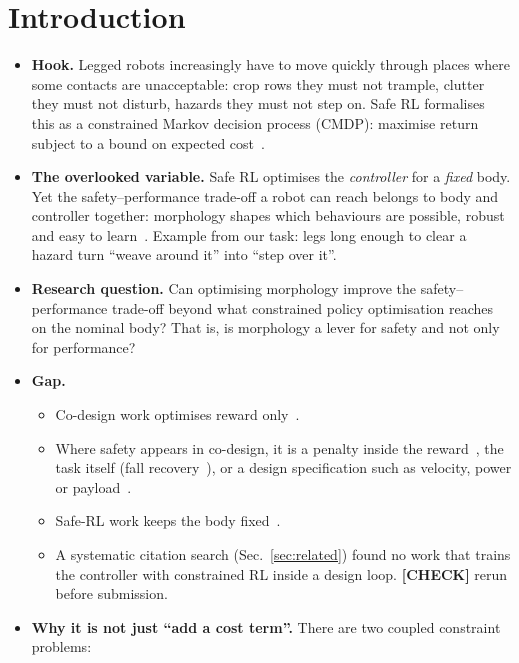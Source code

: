 \documentclass[sigconf,review]{acmart}
\newcommand{\statustag}[2]{\textcolor{#1}{\textsf{\scriptsize\bfseries[#2]}}}
\newcommand{\CHECK}{\statustag{orange!85!black}{CHECK}\hspace{0.3em}}
\newcommand{\sectarget}[1]{\par\noindent{\color{gray}\sffamily\scriptsize Target length: #1}\par\smallskip}
\begin{document}
\section{Introduction}
\label{sec:intro}
\sectarget{1 page including Fig.~\ref{fig:teaser}}
\begin{itemize}
\item \textbf{Hook.} Legged robots increasingly have to move quickly through places where some contacts are unacceptable: crop rows they must not trample, clutter they must not disturb, hazards they must not step on. Safe RL formalises this as a constrained Markov decision process (CMDP): maximise return subject to a bound on expected cost~\cite{altman1999constrained,achiam2017cpo,ray2019benchmarking}.
\item \textbf{The overlooked variable.} Safe RL optimises the \emph{controller} for a \emph{fixed} body. Yet the safety--performance trade-off a robot can reach belongs to body and controller together: morphology shapes which behaviours are possible, robust and easy to learn~\cite{pfeifer2006body,bongard2011morphological}. Example from our task: legs long enough to clear a hazard turn ``weave around it'' into ``step over it''.
\item \textbf{Research question.} Can optimising morphology improve the safety--performance trade-off beyond what constrained policy optimisation reaches on the nominal body? That is, is morphology a lever for safety and not only for performance?
\item \textbf{Gap.}
  \begin{itemize}
  \item Co-design work optimises reward only~\cite{sims1994evolving,ha2019reinforcement,schaff2019jointly,wang2019nge,yuan2022transform2act,gupta2021embodied}.
  \item Where safety appears in co-design, it is a penalty inside the reward~\cite{codesign2025notfree}, the task itself (fall recovery~\cite{yue2025humanoid}), or a design specification such as velocity, power or payload~\cite{glamdring2026}.
  \item Safe-RL work keeps the body fixed~\cite{ray2019benchmarking,ji2023safetygymnasium,kim2024constraints,chanesane2024cat}.
  \item A systematic citation search (Sec.~\ref{sec:related}) found no work that trains the controller with constrained RL inside a design loop. \CHECK{} rerun before submission.
  \end{itemize}
\item \textbf{Why it is not just ``add a cost term''.} There are two coupled constraint problems:

\end{itemize}
\end{document}
